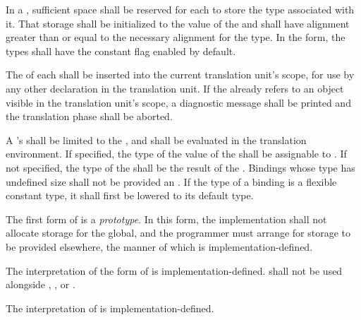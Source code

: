 \specsubsubitem
In a , sufficient space shall be reserved for
each  to store the type associated with it. That
storage shall be initialized to the value of the  and
shall have alignment greater than or equal to the necessary alignment for the
type. In the  form, the types shall have the constant flag
enabled by default.

\specsubsubitem
The  of each  shall be
inserted into the current translation unit's scope, for use by any other
declaration in the translation unit. If the  already
refers to an object visible in the translation unit's scope, a diagnostic
message shall be printed and the translation phase shall be aborted.

\specsubsubitem
A 's  shall be limited to
the , and shall be evaluated
in the translation environment. If specified, the type of the value of the
 shall be assignable to . If not
specified, the type of the  shall be the result
of the . Bindings whose type has undefined size shall
not be provided an . If the type of a binding is a
flexible constant type, it shall first be lowered to its default type.

\specsubsubitem
The first form of  is a \textit{prototype}. In this
form, the implementation shall not allocate storage for the global, and the
programmer must arrange for storage to be provided elsewhere, the manner of
which is implementation-defined.

\specsubsubitem
The interpretation of the  form of  is
implementation-defined.  shall not be used alongside
, , or .


\specsubsubitem
The interpretation of  is implementation-defined.


